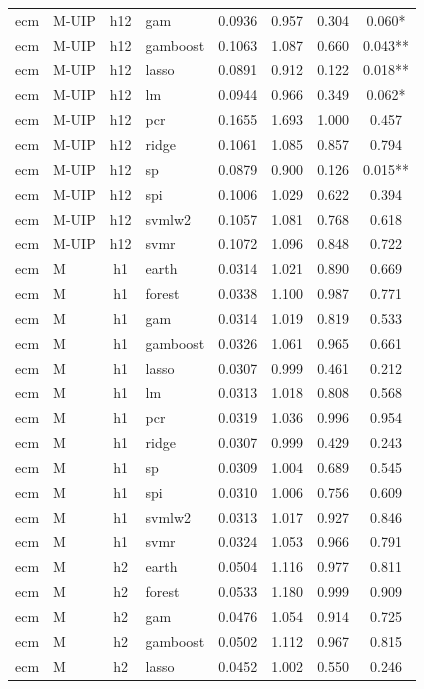 \begin{ThreePartTable}
\begin{longtable}[t]{llclcccc}
ecm & M-UIP & h12 & gam & 0.0936 & 0.957 & 0.304 & 0.060*\\
ecm & M-UIP & h12 & gamboost & 0.1063 & 1.087 & 0.660 & 0.043**\\
ecm & M-UIP & h12 & lasso & 0.0891 & 0.912 & 0.122 & 0.018**\\
ecm & M-UIP & h12 & lm & 0.0944 & 0.966 & 0.349 & 0.062*\\
ecm & M-UIP & h12 & pcr & 0.1655 & 1.693 & 1.000 & 0.457\\
ecm & M-UIP & h12 & ridge & 0.1061 & 1.085 & 0.857 & 0.794\\
ecm & M-UIP & h12 & sp & 0.0879 & 0.900 & 0.126 & 0.015**\\
ecm & M-UIP & h12 & spi & 0.1006 & 1.029 & 0.622 & 0.394\\
ecm & M-UIP & h12 & svmlw2 & 0.1057 & 1.081 & 0.768 & 0.618\\
ecm & M-UIP & h12 & svmr & 0.1072 & 1.096 & 0.848 & 0.722\\
\addlinespace
ecm & M & h1 & earth & 0.0314 & 1.021 & 0.890 & 0.669\\
ecm & M & h1 & forest & 0.0338 & 1.100 & 0.987 & 0.771\\
ecm & M & h1 & gam & 0.0314 & 1.019 & 0.819 & 0.533\\
ecm & M & h1 & gamboost & 0.0326 & 1.061 & 0.965 & 0.661\\
ecm & M & h1 & lasso & 0.0307 & 0.999 & 0.461 & 0.212\\
ecm & M & h1 & lm & 0.0313 & 1.018 & 0.808 & 0.568\\
ecm & M & h1 & pcr & 0.0319 & 1.036 & 0.996 & 0.954\\
ecm & M & h1 & ridge & 0.0307 & 0.999 & 0.429 & 0.243\\
ecm & M & h1 & sp & 0.0309 & 1.004 & 0.689 & 0.545\\
ecm & M & h1 & spi & 0.0310 & 1.006 & 0.756 & 0.609\\
ecm & M & h1 & svmlw2 & 0.0313 & 1.017 & 0.927 & 0.846\\
ecm & M & h1 & svmr & 0.0324 & 1.053 & 0.966 & 0.791\\
\addlinespace
ecm & M & h2 & earth & 0.0504 & 1.116 & 0.977 & 0.811\\
ecm & M & h2 & forest & 0.0533 & 1.180 & 0.999 & 0.909\\
ecm & M & h2 & gam & 0.0476 & 1.054 & 0.914 & 0.725\\
ecm & M & h2 & gamboost & 0.0502 & 1.112 & 0.967 & 0.815\\
ecm & M & h2 & lasso & 0.0452 & 1.002 & 0.550 & 0.246\\

\end{longtable}
\end{ThreePartTable}
